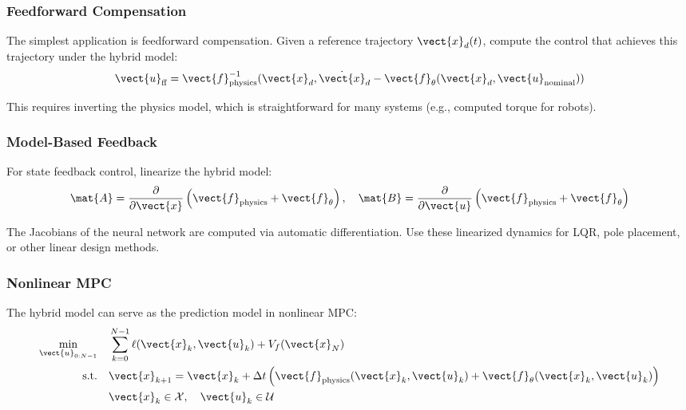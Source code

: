 \subsubsection{Feedforward Compensation}

The simplest application is feedforward compensation. Given a reference trajectory $\vect{x}_d(t)$, compute the control that achieves this trajectory under the hybrid model:
\begin{equation}
\vect{u}_{\text{ff}} = \vect{f}_{\text{physics}}^{-1}(\vect{x}_d, \dot{\vect{x}}_d - \vect{f}_\theta(\vect{x}_d, \vect{u}_{\text{nominal}}))
\label{eq:feedforward_compensation}
\end{equation}

This requires inverting the physics model, which is straightforward for many systems (e.g., computed torque for robots).

\subsubsection{Model-Based Feedback}

For state feedback control, linearize the hybrid model:
\begin{equation}
\mat{A} = \frac{\partial}{\partial \vect{x}}\left(\vect{f}_{\text{physics}} + \vect{f}_\theta\right), \quad
\mat{B} = \frac{\partial}{\partial \vect{u}}\left(\vect{f}_{\text{physics}} + \vect{f}_\theta\right)
\end{equation}

The Jacobians of the neural network are computed via automatic differentiation. Use these linearized dynamics for LQR, pole placement, or other linear design methods.

\subsubsection{Nonlinear MPC}

The hybrid model can serve as the prediction model in nonlinear MPC:
\begin{align}
\min_{\vect{u}_{0:N-1}} \quad & \sum_{k=0}^{N-1} \ell(\vect{x}_k, \vect{u}_k) + V_f(\vect{x}_N) \\
\text{s.t.} \quad & \vect{x}_{k+1} = \vect{x}_k + \Delta t \left(\vect{f}_{\text{physics}}(\vect{x}_k, \vect{u}_k) + \vect{f}_\theta(\vect{x}_k, \vect{u}_k)\right) \\
& \vect{x}_k \in \mathcal{X}, \quad \vect{u}_k \in \mathcal{U}
\end{align}

